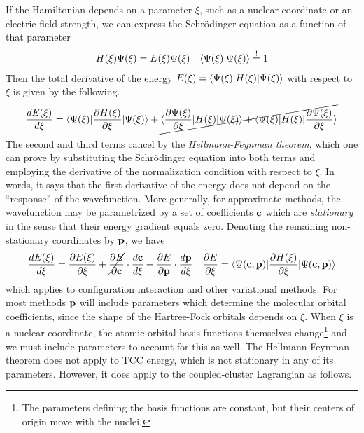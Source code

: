\documentclass[11pt]{article}
\numberwithin{equation}{section}
\begin{document}
\begin{samepage}
\begin{rmk}
If the Hamiltonian depends on a parameter $\xi$, such as a nuclear coordinate or an electric field strength, we can express the Schr\"odinger equation as a function of that parameter
\begin{align}
\label{eq:xi-dependent-schrodinger-equation}
  H(\xi)
  \Y(\xi)
=
  E(\xi)
  \Y(\xi)
&&
  \ip{\Y(\xi)|\Y(\xi)}
\overset{!}{=}
  1
\end{align}
Then the total derivative of the energy $E(\xi)=\ip{\Y(\xi)|H(\xi)|\Y(\xi)}$ with respect to $\xi$ is given by the following.
\begin{align}
  \fd{E(\xi)}{\xi}
=
  \ip{\Y(\xi)|
  \pd{H(\xi)}{\xi}
  |\Y(\xi)}
+
\cancel{
  \ip{\pd{\Y(\xi)}{\xi}|
  H(\xi)
  |\Y(\xi)}
+
  \ip{\Y(\xi)|
  H(\xi)
  |\pd{\Y(\xi)}{\xi}}
}
\end{align}
The second and third terms cancel by the \textit{Hellmann-Feynman theorem}, which one can prove by substituting the Schr\"odinger equation into both terms and employing the derivative of the normalization condition with respect to $\xi$.
In words, it says that the first derivative of the energy does not depend on the  ``response'' of the wavefunction.
More generally, for approximate methods, the wavefunction may be parametrized by a set of coefficients $\mathbf{c}$ which are \textit{stationary} in the sense that their energy gradient equals zero.
Denoting the remaining non-stationary coordinates by $\mathbf{p}$, we have
\begin{align}
  \fd{E(\xi)}{\xi}
=
  \pd{E(\xi)}{\xi}
+
  \cancel{
  \pd{E}{\bo{c}}
  }
  \cdot
  \fd{\bo{c}}{\xi}
+
  \pd{E}{\bo{p}}
  \cdot
  \fd{\bo{p}}{\xi}
&&
  \pd{E}{\xi}
=
  \ip{\Y(\bo{c},\bo{p})|
  \pd{H(\xi)}{\xi}
  |\Y(\bo{c},\bo{p})}
\end{align}
which applies to configuration interaction and other variational methods.
For most methods $\mathbf{p}$ will include parameters which determine the molecular orbital coefficients, since the shape of the Hartree-Fock orbitals depends on $\xi$.
When $\xi$ is a nuclear coordinate, the atomic-orbital basis functions themselves change\footnote{The parameters defining the basis functions are constant, but their centers of origin move with the nuclei.}
and we must include parameters to account for this as well.
The Hellmann-Feynman theorem does not apply to TCC energy, which is not stationary in any of its parameters.
However, it does apply to the coupled-cluster Lagrangian as follows.

\end{rmk}
\end{samepage}
\end{document}
